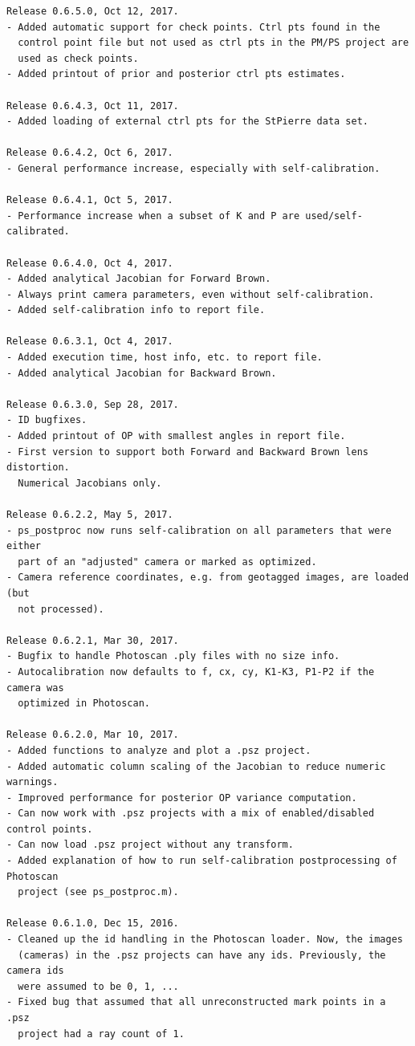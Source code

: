 \documentclass{article}
\begin{document}
\begin{verbatim}
Release 0.6.5.0, Oct 12, 2017.
- Added automatic support for check points. Ctrl pts found in the
  control point file but not used as ctrl pts in the PM/PS project are
  used as check points.
- Added printout of prior and posterior ctrl pts estimates.

Release 0.6.4.3, Oct 11, 2017.
- Added loading of external ctrl pts for the StPierre data set.

Release 0.6.4.2, Oct 6, 2017.
- General performance increase, especially with self-calibration.

Release 0.6.4.1, Oct 5, 2017.
- Performance increase when a subset of K and P are used/self-calibrated.

Release 0.6.4.0, Oct 4, 2017.
- Added analytical Jacobian for Forward Brown.
- Always print camera parameters, even without self-calibration.
- Added self-calibration info to report file.

Release 0.6.3.1, Oct 4, 2017.
- Added execution time, host info, etc. to report file.
- Added analytical Jacobian for Backward Brown.

Release 0.6.3.0, Sep 28, 2017.
- ID bugfixes.
- Added printout of OP with smallest angles in report file.
- First version to support both Forward and Backward Brown lens distortion.
  Numerical Jacobians only.

Release 0.6.2.2, May 5, 2017.
- ps_postproc now runs self-calibration on all parameters that were either 
  part of an "adjusted" camera or marked as optimized.
- Camera reference coordinates, e.g. from geotagged images, are loaded (but
  not processed).

Release 0.6.2.1, Mar 30, 2017.
- Bugfix to handle Photoscan .ply files with no size info.
- Autocalibration now defaults to f, cx, cy, K1-K3, P1-P2 if the camera was
  optimized in Photoscan.

Release 0.6.2.0, Mar 10, 2017.
- Added functions to analyze and plot a .psz project.
- Added automatic column scaling of the Jacobian to reduce numeric warnings.
- Improved performance for posterior OP variance computation.
- Can now work with .psz projects with a mix of enabled/disabled control points.
- Can now load .psz project without any transform.
- Added explanation of how to run self-calibration postprocessing of Photoscan
  project (see ps_postproc.m).

Release 0.6.1.0, Dec 15, 2016.
- Cleaned up the id handling in the Photoscan loader. Now, the images 
  (cameras) in the .psz projects can have any ids. Previously, the camera ids
  were assumed to be 0, 1, ...
- Fixed bug that assumed that all unreconstructed mark points in a .psz
  project had a ray count of 1.


\end{verbatim}
\end{document}
